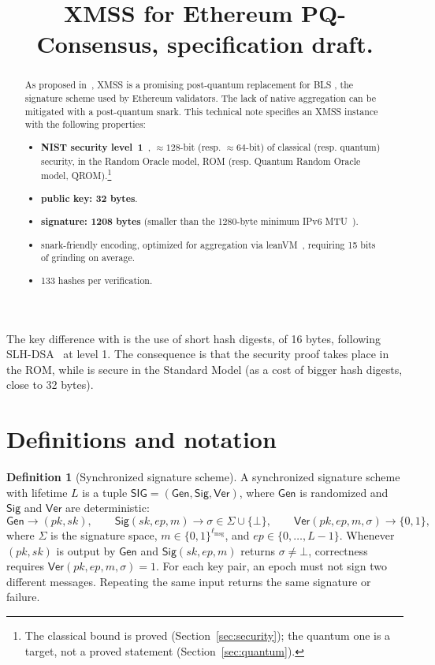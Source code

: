 \documentclass[11pt]{article}
\title{XMSS for Ethereum PQ-Consensus, specification draft.}
\author{}
\date{}
\theoremstyle{definition}
\newtheorem{definition}{Definition}[section]
\theoremstyle{plain}
\theoremstyle{remark}
\newcommand{\bits}[1]{\{0,1\}^{#1}}
\newcommand{\Gen}{\mathsf{Gen}}
\newcommand{\Sig}{\mathsf{Sig}}
\newcommand{\Ver}{\mathsf{Ver}}
\newcommand{\SIG}{\mathsf{SIG}}
\newcommand{\ep}{\mathit{ep}}
\newcommand{\sk}{\mathit{sk}}
\newcommand{\pk}{\mathit{pk}}
\newcommand{\lmsg}{\ell_{\mathrm{msg}}}
\begin{document}
\maketitle

\begin{abstract}
As proposed in~\cite{DKKW25}, XMSS is a promising post-quantum replacement for BLS \cite{BLS}, the signature scheme used by Ethereum validators. The lack of native aggregation can be mitigated with a post-quantum snark. This technical note specifies an XMSS instance with the following properties:
\begin{itemize}
  \item \textbf{NIST security level~1}~\cite{NISTPQC}, $\approx 128$-bit (resp. $\approx 64$-bit) of classical (resp. quantum) security, in the Random Oracle model, ROM (resp. Quantum Random Oracle model, QROM).\footnote{The classical bound is proved (Section~\ref{sec:security}); the quantum one is a target, not a proved statement (Section~\ref{sec:quantum}).}
  \item \textbf{public key: 32 bytes}.
  \item \textbf{signature: 1208 bytes} (smaller than the 1280-byte minimum IPv6 MTU~\cite{RFC8200}).
  \item snark-friendly encoding, optimized for aggregation via leanVM~\cite{leanVM}, requiring 15 bits of grinding on average.
  \item 133 hashes per verification.
\end{itemize}
\end{abstract}

The key difference with \cite{DKKW25} is the use of short hash digests, of 16 bytes, following SLH-DSA~\cite{FIPS205} at level 1. The consequence is that the security proof takes place in the ROM, while \cite{DKKW25} is secure in the Standard Model (as a cost of bigger hash digests, close to 32 bytes).

\section{Definitions and notation}

\begin{definition}[Synchronized signature scheme]
A synchronized signature scheme with lifetime $L$ is a tuple $\SIG=(\Gen,\Sig,\Ver)$, where $\Gen$ is randomized and $\Sig$ and $\Ver$ are deterministic:
\[
  \Gen\longrightarrow(\pk,\sk),\qquad
  \Sig(\sk,\ep,m)\longrightarrow\sigma\in\Sigma\cup\{\bot\},\qquad
  \Ver(\pk,\ep,m,\sigma)\longrightarrow\{0,1\},
\]
where $\Sigma$ is the signature space, $m\in\bits{\lmsg}$, and $\ep\in\{0,\ldots,L-1\}$. Whenever $(\pk,\sk)$ is output by $\Gen$ and $\Sig(\sk,\ep,m)$ returns $\sigma\neq\bot$, correctness requires $\Ver(\pk,\ep,m,\sigma)=1$. For each key pair, an epoch must not sign two different messages. Repeating the same input returns the same signature or failure.
\end{definition}
\end{document}
